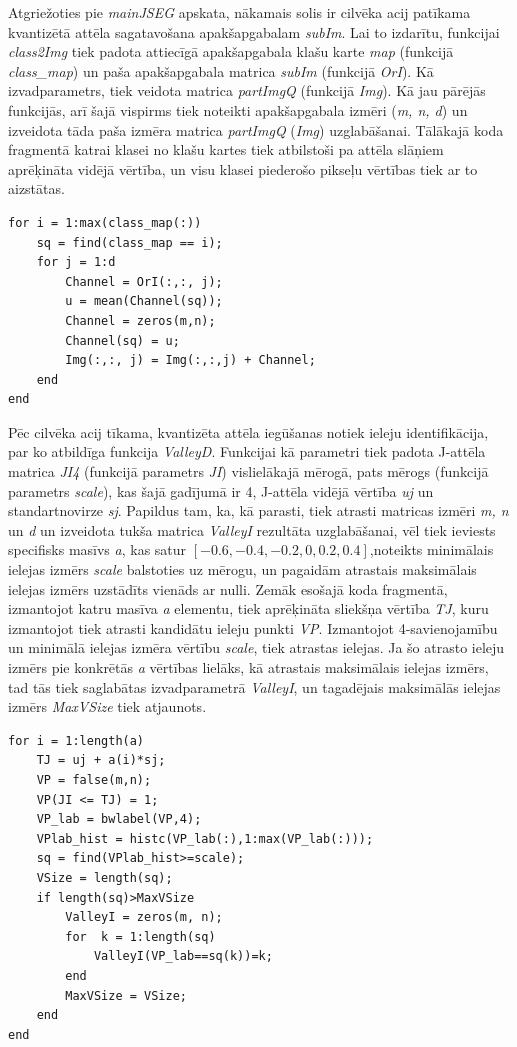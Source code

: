 \documentclass[12pt,paper=a4]{report}
\begin{document}
Atgriežoties pie \textit{mainJSEG} apskata, nākamais solis ir cilvēka acij patīkama kvantizētā attēla sagatavošana apakšapgabalam \textit{subIm}. Lai to izdarītu, funkcijai \textit{class2Img} tiek padota attiecīgā apakšapgabala klašu karte \textit{map} (funkcijā \textit{class_map}) un paša apakšapgabala matrica \textit{subIm} (funkcijā \textit{OrI}). Kā izvadparametrs, tiek veidota matrica \textit{partImgQ} (funkcijā \textit{Img}). Kā jau pārējās funkcijās, arī šajā vispirms tiek noteikti apakšapgabala izmēri (\textit{m, n, d}) un izveidota tāda paša izmēra matrica \textit{partImgQ} (\textit{Img}) uzglabāšanai. Tālākajā koda fragmentā katrai klasei no klašu kartes tiek atbilstoši pa attēla slāņiem aprēķināta vidējā vērtība, un visu klasei piederošo pikseļu vērtības tiek ar to aizstātas.
\begin{lstlisting}
for i = 1:max(class_map(:))
	sq = find(class_map == i);
	for j = 1:d       
	    Channel = OrI(:,:, j);
	    u = mean(Channel(sq));
	    Channel = zeros(m,n);
	    Channel(sq) = u;
		Img(:,:, j) = Img(:,:,j) + Channel;
	end
end
\end{lstlisting} \par
Pēc cilvēka acij tīkama, kvantizēta attēla iegūšanas notiek ieleju identifikācija, par ko atbildīga funkcija \textit{ValleyD}. Funkcijai kā parametri tiek padota J-attēla matrica \textit{JI4} (funkcijā parametrs \textit{JI}) vislielākajā mērogā, pats mērogs (funkcijā parametrs \textit{scale}), kas šajā gadījumā ir 4, J-attēla vidējā vērtība \textit{uj} un standartnovirze \textit{sj}. Papildus tam, ka, kā parasti, tiek atrasti matricas izmēri \textit{m, n} un \textit{d} un izveidota tukša matrica \textit{ValleyI} rezultāta uzglabāšanai, vēl tiek ieviests specifisks masīvs \textit{a}, kas satur $[-0.6, -0.4, -0.2, 0, 0.2, 0.4]$,noteikts minimālais ielejas izmērs \textit{scale} balstoties uz mērogu, un pagaidām atrastais maksimālais ielejas izmērs uzstādīts vienāds ar nulli. Zemāk esošajā koda fragmentā, izmantojot katru masīva \textit{a} elementu, tiek aprēķināta sliekšņa vērtība \textit{TJ}, kuru izmantojot tiek atrasti kandidātu ieleju punkti \textit{VP}. Izmantojot 4-savienojamību un minimālā ielejas izmēra vērtību \textit{scale}, tiek atrastas ielejas. Ja šo atrasto ieleju izmērs pie konkrētās \textit{a} vērtības lielāks, kā atrastais maksimālais ielejas izmērs, tad tās tiek saglabātas izvadparametrā \textit{ValleyI}, un tagadējais maksimālās ielejas izmērs \textit{MaxVSize} tiek atjaunots.
\begin{lstlisting}
for i = 1:length(a)
	TJ = uj + a(i)*sj;
	VP = false(m,n);
	VP(JI <= TJ) = 1;
	VP_lab = bwlabel(VP,4);
	VPlab_hist = histc(VP_lab(:),1:max(VP_lab(:)));
	sq = find(VPlab_hist>=scale);
	VSize = length(sq);
	if length(sq)>MaxVSize
		ValleyI = zeros(m, n);
		for  k = 1:length(sq)
			ValleyI(VP_lab==sq(k))=k;
		end
		MaxVSize = VSize;
	end   
end
\end{lstlisting}\par
\end{document}
